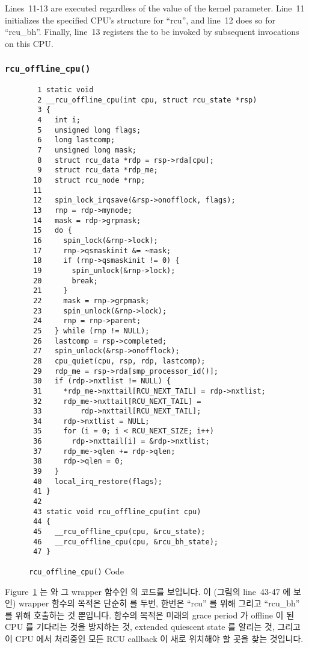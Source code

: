 Lines~11-13 are executed regardless of the value of the
 kernel parameter.
Line~11 initializes the specified CPU's  structure
for ``rcu'', and line~12 does so for ``rcu\_bh''.
Finally, line~13 registers the  to be
invoked by subsequent  invocations on this CPU.
\fi

\subsubsection{\tt rcu\_offline\_cpu()}
\label{app:rcuimpl:rcutreewt:rcu-offline-cpu}

\begin{figure}[tbp]
{ \scriptsize
\begin{verbatim}
  1 static void
  2 __rcu_offline_cpu(int cpu, struct rcu_state *rsp)
  3 {
  4   int i;
  5   unsigned long flags;
  6   long lastcomp;
  7   unsigned long mask;
  8   struct rcu_data *rdp = rsp->rda[cpu];
  9   struct rcu_data *rdp_me;
 10   struct rcu_node *rnp;
 11
 12   spin_lock_irqsave(&rsp->onofflock, flags);
 13   rnp = rdp->mynode;
 14   mask = rdp->grpmask;
 15   do {
 16     spin_lock(&rnp->lock);
 17     rnp->qsmaskinit &= ~mask;
 18     if (rnp->qsmaskinit != 0) {
 19       spin_unlock(&rnp->lock);
 20       break;
 21     }
 22     mask = rnp->grpmask;
 23     spin_unlock(&rnp->lock);
 24     rnp = rnp->parent;
 25   } while (rnp != NULL);
 26   lastcomp = rsp->completed;
 27   spin_unlock(&rsp->onofflock);
 28   cpu_quiet(cpu, rsp, rdp, lastcomp);
 29   rdp_me = rsp->rda[smp_processor_id()];
 30   if (rdp->nxtlist != NULL) {
 31     *rdp_me->nxttail[RCU_NEXT_TAIL] = rdp->nxtlist;
 32     rdp_me->nxttail[RCU_NEXT_TAIL] =
 33         rdp->nxttail[RCU_NEXT_TAIL];
 34     rdp->nxtlist = NULL;
 35     for (i = 0; i < RCU_NEXT_SIZE; i++)
 36       rdp->nxttail[i] = &rdp->nxtlist;
 37     rdp_me->qlen += rdp->qlen;
 38     rdp->qlen = 0;
 39   }
 40   local_irq_restore(flags);
 41 }
 42
 43 static void rcu_offline_cpu(int cpu)
 44 {
 45   __rcu_offline_cpu(cpu, &rcu_state);
 46   __rcu_offline_cpu(cpu, &rcu_bh_state);
 47 }
\end{verbatim}
}
\caption{{\tt rcu\_offline\_cpu()} Code}
\label{fig:app:rcuimpl:rcutreewt:Code for rcu-offline-cpu}
\end{figure}

Figure~\ref{fig:app:rcuimpl:rcutreewt:Code for rcu-offline-cpu}
는  와 그 wrapper 함수인  의
코드를 보입니다.
이 (그림의 line~43-47 에 보인) wrapper 함수의 목적은 단순히
 를 두번, 한번은 ``rcu'' 를 위해 그리고 ``rcu\_bh'' 를
위해 호출하는 것 뿐입니다.
 함수의 목적은 미래의 grace period 가 offline 이 된 CPU
를 기다리는 것을 방지하는 것, extended quiescent state 를 알리는 것, 그리고 이
CPU 에서 처리중인 모든 RCU callback 이 새로 위치해야 할 곳을 찾는 것입니다.

